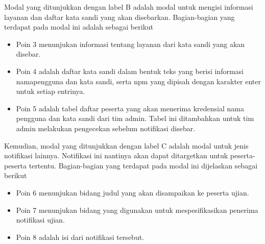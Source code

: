     Modal yang ditunjukkan dengan label B adalah modal untuk mengisi informasi
    layanan dan daftar kata sandi yang akan disebarkan. Bagian-bagian yang
    terdapat pada modal ini adalah sebagai berikut
    \begin{itemize}
        \item Poin 3 menunjukan informasi tentang layanan dari kata sandi yang
            akan disebar.
        
        \item Poin 4 adalah daftar kata sandi dalam bentuk teks yang berisi
            informasi namapengguna dan kata sandi, serta npm yang dipisah dengan
            karakter enter untuk setiap entrinya.
            
        \item Poin 5 adalah tabel daftar peserta yang akan menerima kredensial
            nama pengguna dan kata sandi dari tim admin. Tabel ini ditambahkan
            untuk tim admin melakukan pengecekan sebelum notifikasi disebar.
    \end{itemize}
    
    Kemudian, modal yang ditunjukkan dengan label C adalah modal untuk jenis
    notifikasi lainnya. Notifikasi ini nantinya akan dapat ditargetkan untuk
    peserta-peserta tertentu. Bagian-bagian yang terdapat pada modal ini
    dijelaskan sebagai berikut
    \begin{itemize}
        \item Poin 6 menunjukan bidang judul yang akan disampaikan ke peserta
        ujian.
        
        \item Poin 7 menunjukan bidang yang digunakan untuk mespesifikasikan
        penerima notifikasi ujian.
        
        \item Poin 8 adalah isi dari notifikasi tersebut.
    \end{itemize}
    

